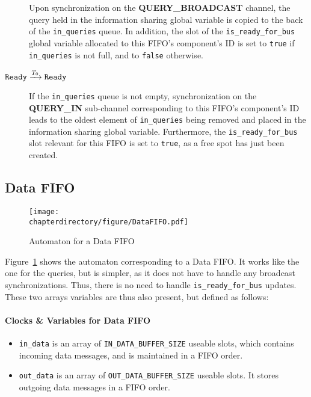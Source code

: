\begin{description}
   Upon synchronization on the \textbf{QUERY\_BROADCAST} channel, the query held
   in the information sharing global variable is copied to the back of the
   \lstinline!in_queries! queue. In addition, the slot of the
   \lstinline!is_ready_for_bus! global variable allocated to this FIFO's
   component's ID is set to \lstinline!true! if \lstinline!in_queries! is not
   full, and to \lstinline!false! otherwise.

\item[$\texttt{Ready} \xrightarrow[]{T_{0}} \texttt{Ready}$]
   If the \lstinline!in_queries! queue is not empty, synchronization on the
   \textbf{QUERY\_IN} sub-channel corresponding to this FIFO's component's ID
   leads to the oldest element of \lstinline!in_queries! being removed and
   placed in the information sharing global variable. Furthermore,
   the \lstinline!is_ready_for_bus! slot relevant for this FIFO is set to
   \lstinline!true!, as a free spot has just been created.
\end{description}

\subsection{Data FIFO}
\begin{figure}[hbt!]
\begin{center}
\texttt{[image: \\chapterdirectory/figure/DataFIFO.pdf]}
\end{center}
\caption{Automaton for a Data FIFO}
\label{fig:UPPAAL:DataFIFO}
\end{figure}

Figure~\ref{fig:UPPAAL:DataFIFO} shows the automaton corresponding to a Data
FIFO. It works like the one for the queries, but is simpler, as it does not have
to handle any broadcast synchronizations. Thus, there is no need to handle
\lstinline!is_ready_for_bus! updates. These two arrays variables are thus also
present, but defined as follows:
\paragraph{Clocks \& Variables for Data FIFO}
\begin{itemize}
\item
   \lstinline!in_data! is an array of \lstinline!IN_DATA_BUFFER_SIZE!
   useable slots, which contains incoming data messages, and is
   maintained in a FIFO order.
\item
   \lstinline!out_data! is an array of \lstinline!OUT_DATA_BUFFER_SIZE!
   useable slots. It stores outgoing data messages in a FIFO order.
\end{itemize}

